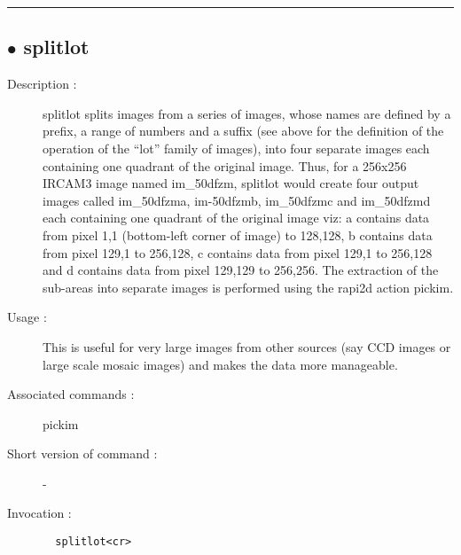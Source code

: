 \hrule \subsection*{$\bullet$ splitlot}
\begin{description}
\item[Description :] splitlot splits images from a series of images, whose names
are defined by a prefix, a range of numbers and a suffix (see above for
the definition of the operation of the ``lot'' family of images), into four
separate images each containing one quadrant of the original image. Thus,
for a 256x256 {\sc IRCAM3} image named im\_50dfzm, splitlot would create four
output images called im\_50dfzma, im-50dfzmb, im\_50dfzmc and im\_50dfzmd
each containing one quadrant of the original image viz: a contains data
from pixel 1,1 (bottom-left corner of image) to 128,128, b contains data
from pixel 129,1 to 256,128, c contains data from pixel 129,1 to 256,128
and d contains data from pixel 129,129 to 256,256.  The extraction of the
sub-areas into separate images is performed using the rapi2d action
pickim. 
\item[Usage :] This is useful for very large images from other sources (say CCD
images or large scale mosaic images) and makes the data more manageable.
\item[Associated commands :] pickim
\item[Short version of command :] -
\item[Invocation :]

\verb+  splitlot<cr> +\end{description}

